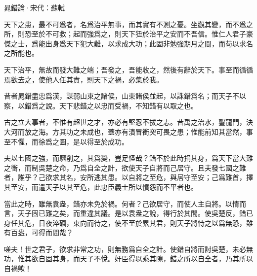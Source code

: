 \documentclass[12pt,a4paper]{ctexbook}
\begin{document}
晁錯論·宋代：蘇軾 \par
天下之患，最不可爲者，名爲治平無事，而其實有不測之憂。坐觀其變，而不爲之所，則恐至於不可救；起而強爲之，則天下狃於治平之安而不吾信。惟仁人君子豪傑之士，爲能出身爲天下犯大難，以求成大功；此固非勉強期月之間，而苟以求名之所能也。\par
天下治平，無故而發大難之端；吾發之，吾能收之，然後有辭於天下。事至而循循焉欲去之，使他人任其責，則天下之禍，必集於我。\par
昔者晁錯盡忠爲漢，謀弱山東之諸侯，山東諸侯並起，以誅錯爲名；而天子不以察，以錯爲之說。天下悲錯之以忠而受禍，不知錯有以取之也。\par
古之立大事者，不惟有超世之才，亦必有堅忍不拔之志。昔禹之治水，鑿龍門，決大河而放之海。方其功之未成也，蓋亦有潰冒衝突可畏之患；惟能前知其當然，事至不懼，而徐爲之圖，是以得至於成功。\par
夫以七國之強，而驟削之，其爲變，豈足怪哉？錯不於此時捐其身，爲天下當大難之衝，而制吳楚之命，乃爲自全之計，欲使天子自將而己居守。且夫發七國之難者，誰乎？己欲求其名，安所逃其患。以自將之至危，與居守至安；己爲難首，擇其至安，而遣天子以其至危，此忠臣義士所以憤怨而不平者也。\par
當此之時，雖無袁盎，錯亦未免於禍。何者？己欲居守，而使人主自將。以情而言，天子固已難之矣，而重違其議。是以袁盎之說，得行於其間。使吳楚反，錯已身任其危，日夜淬礪，東向而待之，使不至於累其君，則天子將恃之以爲無恐，雖有百盎，可得而間哉？\par
嗟夫！世之君子，欲求非常之功，則無務爲自全之計。使錯自將而討吳楚，未必無功，惟其欲自固其身，而天子不悅。奸臣得以乘其隙，錯之所以自全者，乃其所以自禍歟！\par
\end{document}
